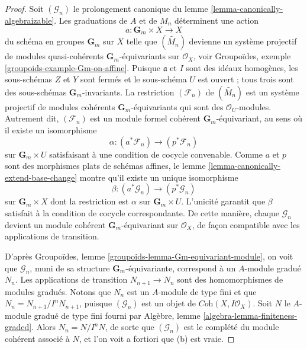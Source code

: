 \begin{proof}
Soit $(\mathcal{G}_n)$ le prolongement canonique du
lemme \ref{lemma-canonically-algebraizable}.
Les graduations de $A$ et de $M_n$ déterminent une action
$$
a : \mathbf{G}_m \times X \longrightarrow X
$$
du schéma en groupes $\mathbf{G}_m$ sur $X$ telle que
$(\widetilde{M_n})$ devienne un système projectif de
modules quasi-cohérents $\mathbf{G}_m$-équivariants sur $\mathcal{O}_X$, voir
Groupoïdes, exemple \ref{groupoids-example-Gm-on-affine}.
Puisque $\mathfrak a$ et $I$ sont des idéaux homogènes,
les sous-schémas $Z$ et $Y$ sont fermés et le sous-schéma $U$ est ouvert ;
tous trois sont des sous-schémas $\mathbf{G}_m$-invariants.
La restriction $(\mathcal{F}_n)$ de $(\widetilde{M_n})$
est un système projectif de modules cohérents $\mathbf{G}_m$-équivariants
qui sont des $\mathcal{O}_U$-modules. Autrement dit, $(\mathcal{F}_n)$
est un module formel cohérent $\mathbf{G}_m$-équivariant,
au sens où il existe un isomorphisme
$$
\alpha : (a^*\mathcal{F}_n) \longrightarrow (p^*\mathcal{F}_n)
$$
sur $\mathbf{G}_m \times U$ satisfaisant à une condition de cocycle convenable.
Comme $a$ et $p$ sont des morphismes plats de schémas affines,
le lemme \ref{lemma-canonically-extend-base-change}
montre qu'il existe un unique isomorphisme
$$
\beta : (a^*\mathcal{G}_n) \longrightarrow (p^*\mathcal{G}_n)
$$
sur $\mathbf{G}_m \times X$ dont la restriction est $\alpha$ sur
$\mathbf{G}_m \times U$. L'unicité garantit que
$\beta$ satisfait à la condition de cocycle correspondante.
De cette manière, chaque $\mathcal{G}_n$ devient
un module cohérent $\mathbf{G}_m$-équivariant sur $\mathcal{O}_X$,
de façon compatible avec les applications de transition.

\medskip\noindent
D'après Groupoïdes, lemme \ref{groupoids-lemma-Gm-equivariant-module},
on voit que $\mathcal{G}_n$, muni de sa structure $\mathbf{G}_m$-équivariante,
correspond à un $A$-module gradué $N_n$. Les applications de transition
$N_{n + 1} \to N_n$ sont des homomorphismes de modules gradués. Notons que $N_n$ est un
$A$-module de type fini et que $N_n = N_{n + 1}/I^n N_{n + 1}$, puisque
$(\mathcal{G}_n)$ est un objet de $\textit{Coh}(X, I\mathcal{O}_X)$.
Soit $N$ le $A$-module gradué de type fini fourni par
Algèbre, lemme \ref{algebra-lemma-finiteness-graded}.
Alors $N_n = N/I^nN$, de sorte que $(\mathcal{G}_n)$
est le complété du module cohérent
associé à $N$, et l'on voit a fortiori que (b) est vraie.


\end{proof}
